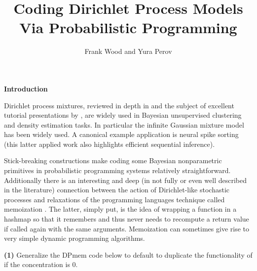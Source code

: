 \documentclass[11pt,reqno]{amsart}
\title{Coding Dirichlet Process Models Via Probabilistic Programming}
\author{Frank Wood and Yura Perov}
\newcommand{\+}[1]{\ensuremath{{\mathbf{#1}}}}
\begin{document}
\maketitle

{\bf Introduction}
\vspace{.5cm}

Dirichlet process mixtures, reviewed in depth in \citep{teh2010dirichlet,orbanz2010bayesian} and the subject of excellent tutorial presentations by \citet{teh2007dirichlet}, are widely used in Bayesian unsupervised clustering and density estimation tasks.  In particular the infinite Gaussian mixture model \cite{rasmussen1999infinite} has been widely used.  A canonical example application is neural spike sorting \cite{wood2008nonparametric} (this latter applied work also highlights efficient sequential inference).  

Stick-breaking constructions \citep{ishwaran2001gibbs} make coding some Bayesian nonparametric primitives in probabilistic programming systems relatively straightforward.  Additionally there is an interesting and deep (in not fully or even well described in the literature) connection between the action of  Dirichlet-like stochastic processes and relaxations of the programming languages technique called memoization \citep{michie1968memo}.  The latter, simply put, is the idea of wrapping a function in a hashmap so that it remembers and thus never needs to recompute a return value if called again with the same arguments.  Memoization can sometimes give rise to very simple dynamic programming algorithms.




\vspace{.5cm}

\vspace{.5cm}

\vspace{1cm}
{\bf (1)} Generalize the DPmem code below to default to duplicate the functionality of  if the concentration is $0$.
\newline
\end{document}
